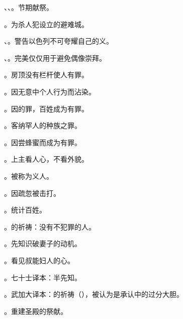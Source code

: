 、、。节期献祭。\par

。为杀人犯设立的避难城。\par

、。警告以色列不可夸耀自己的义。\par

、。完美仅仅用于避免偶像崇拜。\par

。房顶没有栏杆使人有罪。\par

。因无意中个人行为而沾染。\par

。因的罪，百姓成为有罪。\par

。客纳罕人的种族之罪。\par

。因尝蜂蜜而成为有罪。\par

。上主看人心，不看外貌。\par

。被称为义人。\par

。因疏忽被击打。\par

。统计百姓。\par

。的祈祷：没有不犯罪的人。\par

。先知识破妻子的动机。\par

。看见叔能妇人的心。\par

。七十士译本：半先知。\par

。武加大译本：的祈祷（），被认为是承认中的过分大胆。\par

。重建圣殿的祭献。\par

